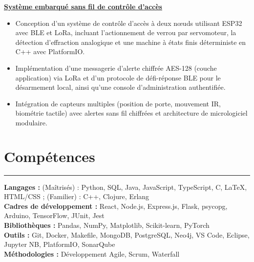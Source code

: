 \documentclass[10pt]{article}
\begin{document}
\href{https://github.com/Extinctable/SOEN-422-Project}{\textbf{Système embarqué sans fil de contrôle d'accès}}
\vspace{-4mm}
\begin{itemize}[left=0.15in, itemsep=1pt, label=--]
    \item Conception d'un système de contrôle d'accès à deux nœuds utilisant ESP32 avec BLE et LoRa, incluant l'actionnement de verrou par servomoteur, la détection d'effraction analogique et une machine à états finis déterministe en C++ avec PlatformIO.
    \item Implémentation d'une messagerie d'alerte chiffrée AES-128 (couche application) via LoRa et d'un protocole de défi-réponse BLE pour le désarmement local, ainsi qu'une console d'administration authentifiée.
    \item Intégration de capteurs multiples (position de porte, mouvement IR, biométrie tactile) avec alertes sans fil chiffrées et architecture de micrologiciel modulaire.
\end{itemize}

\vspace{-6mm} %
\section*{Compétences}
\vspace{-2mm}
\hrule
\vspace{0mm}
\textbf{Langages :} (Maîtrisés) : Python, SQL, Java, JavaScript, TypeScript, C, LaTeX, HTML/CSS ; (Familier) : C++, Clojure, Erlang \\
\textbf{Cadres de développement :} React, Node.js, Express.js, Flask, psycopg, Arduino, TensorFlow, JUnit, Jest \\
\textbf{Bibliothèques :} Pandas, NumPy, Matplotlib, Scikit-learn, PyTorch \\
\textbf{Outils :} Git, Docker, Makefile, MongoDB, PostgreSQL, Neo4j, VS Code, Eclipse, Jupyter NB, PlatformIO, SonarQube \\
\textbf{Méthodologies :} Développement Agile, Scrum, Waterfall
\end{document}
